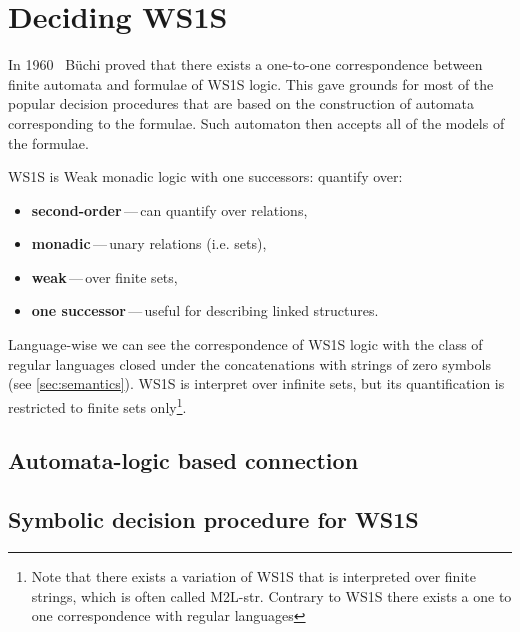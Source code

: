  
\chapter{Deciding WS1S}
\begin{intro}
In 1960~\cite{buchi} B\"{u}chi proved that there exists a one-to-one
correspondence between finite automata and formulae of WS1S logic.
This gave grounds for most of the popular decision procedures that 
are based on the construction of automata corresponding to the formulae.
Such automaton then accepts all of the models of the formulae.
\end{intro}

WS1S is Weak monadic logic with one successors:
quantify over:
\begin{itemize}
  \item \textbf{second-order}\,---\,can quantify over relations,
  \item \textbf{monadic}\,---\,unary relations (i.e. sets),
  \item \textbf{weak}\,---\,over finite sets,
  \item \textbf{one successor}\,---\,useful for describing linked structures.
\end{itemize}

Language-wise we can see the correspondence of WS1S logic with the
class of regular languages closed under the concatenations with 
strings of zero symbols (see \ref{sec:semantics}). WS1S is interpret
over infinite sets, but its quantification is restricted to finite
sets only\footnote{Note that there exists a variation of WS1S that is
interpreted over finite strings, which is often called M2L-str. 
Contrary to WS1S there exists a one to one correspondence with 
regular languages}.

\section{Automata-logic based connection}

\section{Symbolic decision procedure for WS1S}


%

